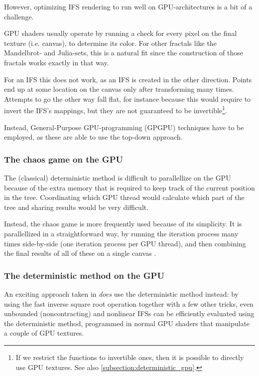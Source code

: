 \documentclass[11pt]{article}
\begin{document}
However, optimizing IFS rendering to run well on GPU-architectures is a bit of a challenge.

GPU shaders usually operate by running a check for every pixel on the final texture (i.e. canvas), to determine its color.
For other fractals like the Mandelbrot- and Julia-sets, this is a natural fit since the construction of those fractals works exactly in that way.

For an IFS this does not work, as an IFS is created in the other direction. 
Points end up at some location on the canvas only after transforming many times.
Attempts to go the other way fall flat, for instance because this would require to invert the IFS's mappings, 
but they are not guaranteed to be invertible\footnote{If we restrict the functions to invertible ones, then it is possible to directly use GPU textures.
See also \autoref{subsection:deterministic_gpu}.}.

Instead, General-Purpose GPU-programming (GPGPU) techniques have to be employed, as these are able to use the top-down approach.

\subsubsection{The chaos game on the GPU}
\label{sec:orgf35d103}
\label{subsection:chaos_game_gpu}

The (classical) deterministic method is difficult to parallellize on the GPU because of the extra memory that is required to keep track of the current position in the tree.
Coordinating which GPU thread would calculate which part of the tree and sharing results would be very difficult.

Instead, the chaos game is more frequently used because of its simplicity. 
It is parallellized in a straightforward way, 
by running the iteration process many times side-by-side (one iteration process per GPU thread),
and then combining the final results of all of these on a single canvas \cite{green2005gpu}.

\subsubsection{The deterministic method on the GPU}
\label{sec:orgedf7f19}
\label{subsection:deterministic_gpu}

An exciting approach taken in \cite{lawlor2012gpu} \emph{does} use the deterministic method instead:
by using the fast inverse square root operation together with a few other tricks, 
even unbounded (noncontracting) and nonlinear IFSs can be efficiently
evaluated using the deterministic method, programmed in normal GPU shaders that manipulate a couple of GPU textures.
\end{document}
